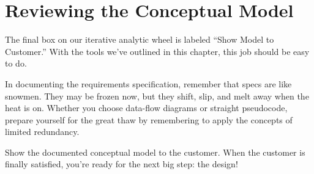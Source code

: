 \section{Reviewing the Conceptual Model}%
%

The final box on our iterative analytic wheel is labeled ``Show Model
to Customer.'' With the tools we've outlined in this chapter, this job
should be easy to do.

In documenting the requirements specification, remember that specs are
like snowmen. They may be frozen now, but they shift, slip, and melt
away when the heat is on. Whether you choose data-flow diagrams or
straight \Forth{} pseudocode, prepare yourself for the great thaw by
remembering to apply the concepts of limited redundancy.

Show the documented conceptual model to the customer. When the
customer is finally satisfied, you're ready for the next big step: the
design!%
%

